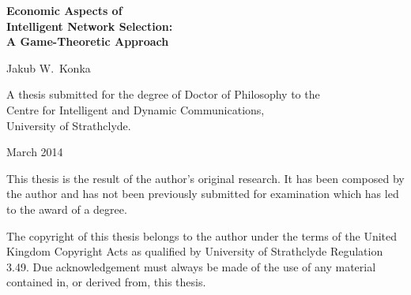 \begin{titlepage}
\begin{RaggedRight}

\vspace*{2.2cm}

{\bf\sffamily\Huge Economic Aspects of}\\[1ex]
{\bf\sffamily\Huge Intelligent Network Selection:}\\[1ex]
{\bf\sffamily\Huge A Game-Theoretic Approach}

\par
\vspace{2cm}

{\sffamily\Large Jakub W.~Konka}

\par
\vspace{6.5cm}

A thesis submitted for the degree of Doctor of Philosophy to the \\Centre for Intelligent and Dynamic Communications,\\ University of Strathclyde.

\par
\vspace{1cm}

March 2014

\cleardoublepage


\vspace*{2.2cm}

This thesis is the result of the author's original research. It has been composed by the author and has not been previously submitted for examination which has led to the award of a degree.

\cleardoublepage

\vspace*{2.2cm}

The copyright of this thesis belongs to the author under the terms of the United Kingdom Copyright Acts as qualified by University of Strathclyde Regulation 3.49. Due acknowledgement must always be made of the use of any material contained in, or derived from, this thesis.

\cleardoublepage
\end{RaggedRight}
\end{titlepage}